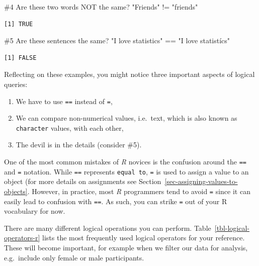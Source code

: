 \documentclass[
  letterpaper,
]{krantz}
\makeatletter
\newenvironment{Shaded}{\begin{snugshade}}{\end{snugshade}}
\newcommand{\CommentTok}[1]{\textcolor[rgb]{0.37,0.37,0.37}{#1}}
\newcommand{\SpecialCharTok}[1]{\textcolor[rgb]{0.37,0.37,0.37}{#1}}
\newcommand{\StringTok}[1]{\textcolor[rgb]{0.13,0.47,0.30}{#1}}
\providecommand{\tightlist}{%
  \setlength{\itemsep}{0pt}\setlength{\parskip}{0pt}}\usepackage{longtable,booktabs,array}
\newenvironment{kframe}{%
\medskip{}
\setlength{\fboxsep}{.8em}
 \def\at@end@of@kframe{}%
 \ifinner\ifhmode%
  \def\at@end@of@kframe{\end{minipage}}%
  \begin{minipage}{\columnwidth}%
 \fi\fi%
 \def\FrameCommand##1{\hskip\@totalleftmargin \hskip-\fboxsep
 \colorbox{shadecolor}{##1}\hskip-\fboxsep
     \hskip-\linewidth \hskip-\@totalleftmargin \hskip\columnwidth}%
 \MakeFramed {\advance\hsize-\width
   \@totalleftmargin\z@ \linewidth\hsize
   \@setminipage}}%
 {\par\unskip\endMakeFramed%
 \at@end@of@kframe}
\renewenvironment{Shaded}{\begin{kframe}}{\end{kframe}}
\makeatother
\begin{document}
\begin{Shaded}
\begin{Highlighting}[]
\CommentTok{\#4 Are these two words NOT the same?}
\StringTok{"Friends"} \SpecialCharTok{!=} \StringTok{"friends"}
\end{Highlighting}
\end{Shaded}

\begin{verbatim}
[1] TRUE
\end{verbatim}

\begin{Shaded}
\begin{Highlighting}[]
\CommentTok{\#5 Are these sentences the same?}
\StringTok{"I love statistics"} \SpecialCharTok{==} \StringTok{"I love statistícs"}
\end{Highlighting}
\end{Shaded}

\begin{verbatim}
[1] FALSE
\end{verbatim}

Reflecting on these examples, you might notice three important aspects
of logical queries:

\begin{enumerate}
\def\labelenumi{\arabic{enumi}.}
\tightlist
\item
  We have to use \texttt{==} instead of \texttt{=},
\item
  We can compare non-numerical values, i.e.~text, which is also known as
  \texttt{character} values, with each other,
\item
  The devil is in the details (consider \#5).
\end{enumerate}

One of the most common mistakes of \emph{R} novices is the confusion
around the \texttt{==} and \texttt{=} notation. While \texttt{==}
represents \texttt{equal\ to}, \texttt{=} is used to assign a value to
an object (for more details on assignments see
Section~\ref{sec-assigning-values-to-objects}. However, in practice,
most \emph{R} programmers tend to avoid \texttt{=} since it can easily
lead to confusion with \texttt{==}. As such, you can strike \texttt{=}
out of your R vocabulary for now.

There are many different logical operations you can perform.
Table~\ref{tbl-logical-operators-r} lists the most frequently used
logical operators for your reference. These will become important, for
example when we filter our data for analysis, e.g.~include only female
or male participants.
\end{document}
